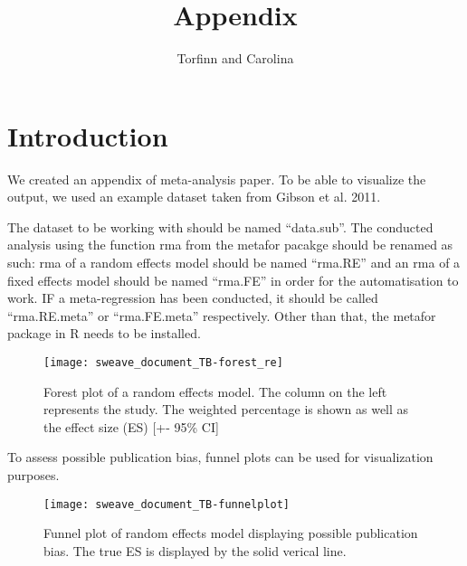 \documentclass[11pt, a4paper]{article} %
\begin{document}



\title{Appendix}

\author{Torfinn and Carolina}

\maketitle



\section{Introduction}%

We created an appendix of meta-analysis paper. To be able to visualize the output, we used an example dataset taken from Gibson et al. 2011.

The dataset to be working with should be named ``data.sub''. The conducted analysis using the function rma from the metafor pacakge should be renamed as such: rma of a random effects model should be named ``rma.RE'' and an rma of a fixed effects model should be named ``rma.FE'' in order for the automatisation to work. IF a meta-regression has been conducted, it should be called ``rma.RE.meta'' or ``rma.FE.meta'' respectively. Other than that, the metafor package in R needs to be installed.  



\begin{figure}
\captionsetup{width=0.6\textwidth}
\centering
\texttt{[image: sweave\_document\_TB-forest\_re]}

\caption{Forest plot of a random effects model. The column on the left represents the study. The weighted percentage is shown as well as the effect size (ES) [+- 95\% CI]}
\end{figure}


To assess possible publication bias, funnel plots can be used for visualization purposes.

\begin{figure}
\captionsetup{width=0.6\textwidth}
\centering
\texttt{[image: sweave\_document\_TB-funnelplot]}
\caption{Funnel plot of random effects model displaying possible publication bias. The true ES is displayed by the solid verical line.}
\end{figure}
\end{document}
